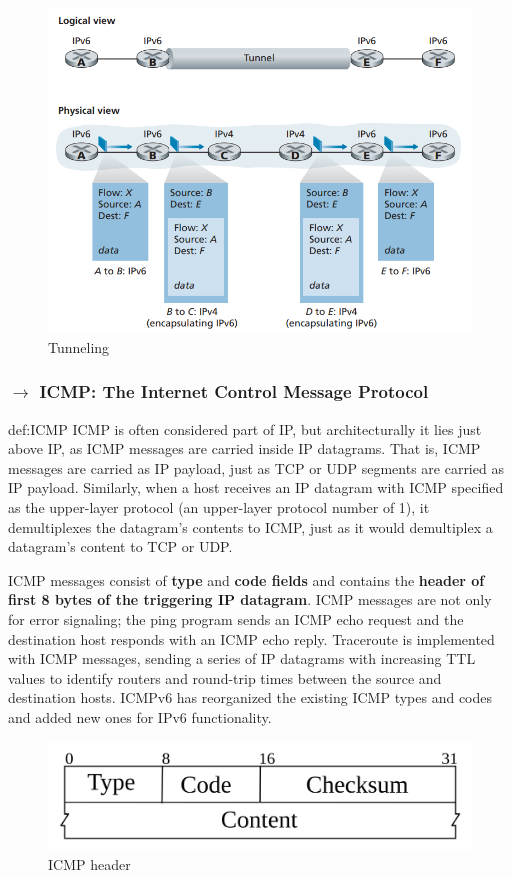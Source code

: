 \begin{figure}[H]
    \centering
    \includegraphics[width = 0.65\linewidth]{img/4/data-plane/tunneling.png}
    \caption{Tunneling \cite{Kurose2017}}
    \label{fig:tunneling}
\end{figure}

\newpage
\subsubsection[4.4.6 ICMP: The Internet Control Message Protocol]{$\rightarrow$ ICMP: The Internet Control Message Protocol}
\begin{theo}{def:ICMP}\label{def:ICMP}
    ICMP is often considered part of IP, but architecturally it lies just above IP, as ICMP messages are carried inside IP datagrams. That is, ICMP messages are carried as IP payload, just as TCP or UDP segments are carried as IP payload. Similarly, when a host receives an IP datagram with ICMP specified as the upper-layer protocol (an upper-layer protocol number of 1), it demultiplexes the datagram’s contents to ICMP, just as it would demultiplex a datagram’s content to TCP or UDP.
\end{theo}

\noindent ICMP messages consist of \textbf{type} and \textbf{code fields} and contains the \textbf{header of first 8 bytes of the triggering IP datagram}. ICMP messages are not only for error signaling; the ping program sends an ICMP echo request and the destination host responds with an ICMP echo reply. Traceroute is implemented with ICMP messages, sending a series of IP datagrams with increasing TTL values to identify routers and round-trip times between the source and destination hosts. ICMPv6 has reorganized the existing ICMP types and codes and added new ones for IPv6 functionality.

\begin{figure}[H]
    \centering
    \includegraphics[width = 0.65\linewidth]{img/4/data-plane/ICMP-segment.png}
    \caption{ICMP header}
    \label{fig:icmp-header}
\end{figure}

